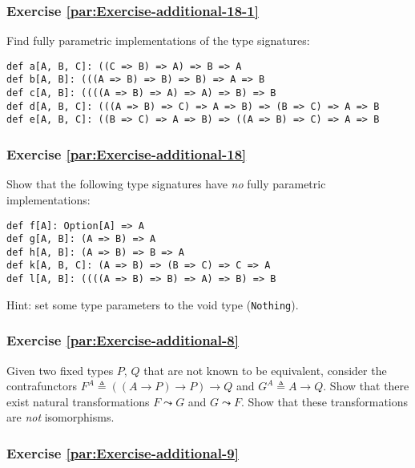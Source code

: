 \subsubsection{Exercise \label{par:Exercise-additional-18-1}\ref{par:Exercise-additional-18-1}}

Find fully parametric implementations of the type signatures:

\begin{lstlisting}
def a[A, B, C]: ((C => B) => A) => B => A
def b[A, B]: (((A => B) => B) => B) => A => B
def c[A, B]: ((((A => B) => A) => A) => B) => B
def d[A, B, C]: (((A => B) => C) => A => B) => (B => C) => A => B
def e[A, B, C]: ((B => C) => A => B) => ((A => B) => C) => A => B
\end{lstlisting}


\subsubsection{Exercise \label{par:Exercise-additional-18}\ref{par:Exercise-additional-18}}

Show that the following type signatures have \emph{no} fully parametric
implementations:

\begin{lstlisting}
def f[A]: Option[A] => A
def g[A, B]: (A => B) => A
def h[A, B]: (A => B) => B => A
def k[A, B, C]: (A => B) => (B => C) => C => A
def l[A, B]: ((((A => B) => B) => A) => B) => B
\end{lstlisting}

Hint: set some type parameters to the void type (\lstinline!Nothing!).

\subsubsection{Exercise \label{par:Exercise-additional-8}\ref{par:Exercise-additional-8}}

Given two fixed types $P$, $Q$ that are not known to be equivalent,
consider the contrafunctors $F^{A}\triangleq\left(\left(A\rightarrow P\right)\rightarrow P\right)\rightarrow Q$
and $G^{A}\triangleq A\rightarrow Q$. Show that there exist natural
transformations $F\leadsto G$ and $G\leadsto F$. Show that these
transformations are \emph{not} isomorphisms.

\subsubsection{Exercise \label{par:Exercise-additional-9}\ref{par:Exercise-additional-9}}

